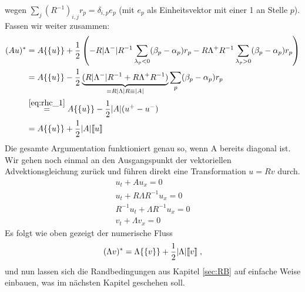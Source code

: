 wegen $\sum_j (R^{-1})_{i,j} r_p = \delta_{i,p} e_p$ (mit $e_p$ als Einheitsvektor mit einer 1 an Stelle $p$). Fassen wir weiter zusammen:
\begin{align}
  (Au)^* &= A \{\{ u \}\} + \frac{1}{2} \left( -R|\Lambda^-|R^{-1} \sum_{\lambda_p < 0} (\beta_p - \alpha_p)r_p
              - R\Lambda^+R^{-1} \sum_{\lambda_p > 0} (\beta_p - \alpha_p)r_p        \right) \\
        &= A \{\{ u \}\} - \frac{1}{2} \underbrace{(R|\Lambda^-|R^{-1} + R\Lambda^+R^{-1})}_{=R|\Lambda|R \equiv |A|}  \sum_p(\beta_p - \alpha_p)r_p   \\
        &\stackrel{\eqref{eq:rhc_1}}{=} A \{\{ u \}\} - \frac{1}{2} |A| (u^+-u^-) \\
        &= A \{\{ u \}\} + \frac{1}{2} |A| \llbracket u \rrbracket
\end{align}
Die gesamte Argumentation funktioniert genau so, wenn A bereits diagonal ist. Wir gehen noch einmal an den Ausgangspunkt der vektoriellen Advektionsgleichung zurück und führen direkt eine Transformation $u=Rv$ durch.
\begin{align}
  u_t + A u_x = 0\\
  u_t + R\Lambda R^{-1} u_x = 0 \\
  R^{-1} u_t + \Lambda R^{-1} u_x = 0 \\
  v_t + \Lambda v_x = 0
\end{align}
Es folgt wie oben gezeigt der numerische Fluss
\begin{align}
  (\Lambda v)^* = \Lambda\{\{ v \}\} + \frac{1}{2}|\Lambda|\llbracket v \rrbracket \; ,
\end{align}
und nun lassen sich die Randbedingungen aus Kapitel \ref{sec:RB} auf einfache Weise einbauen, was im nächsten Kapitel geschehen soll.

